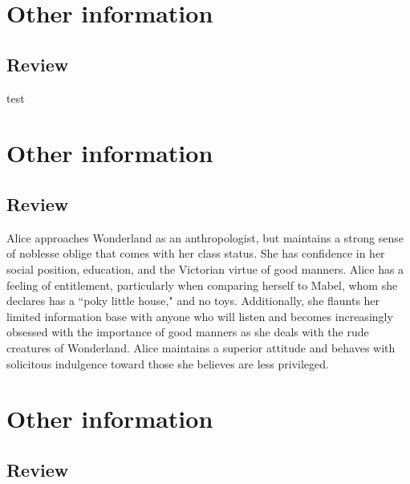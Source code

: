 \documentclass[letterpaper]{twentysecondcv} %
\begin{document}

\section{Other information}

\subsection{Review}

test


\newpage %

\sidebartwo %

\section{Other information}

\subsection{Review}

Alice approaches Wonderland as an anthropologist, but maintains a strong sense of noblesse oblige that comes with her class status. She has confidence in her social position, education, and the Victorian virtue of good manners. Alice has a feeling of entitlement, particularly when comparing herself to Mabel, whom she declares has a ``poky little house," and no toys. Additionally, she flaunts her limited information base with anyone who will listen and becomes increasingly obsessed with the importance of good manners as she deals with the rude creatures of Wonderland. Alice maintains a superior attitude and behaves with solicitous indulgence toward those she believes are less privileged.

\section{Other information}

\subsection{Review}
\end{document}
